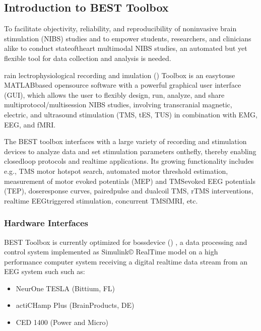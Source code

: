 \documentclass[letterpaper,10pt,english]{sphinxmanual}
\begin{document}
\subsection{Introduction to BEST Toolbox}
\label{\detokenize{1_Home:introduction-to-best-toolbox}}\label{\detokenize{1_Home::doc}}
\sphinxAtStartPar
To facilitate objectivity, reliability, and reproducibility of non\sphinxhyphen{}invasive brain stimulation (NIBS) studies and to empower students, researchers, and clinicians alike to conduct state\sphinxhyphen{}of\sphinxhyphen{}the\sphinxhyphen{}art multimodal NIBS studies, an automated but yet flexible tool for data collection and analysis is needed.

\sphinxAtStartPar
{}rain lectrophysiological recording and imulation () Toolbox is an easy\sphinxhyphen{}to\sphinxhyphen{}use MATLAB\sphinxhyphen{}based open\sphinxhyphen{}source software with a powerful graphical user interface (GUI), which allows the user to flexibly design, run, analyze, and share multi\sphinxhyphen{}protocol/multi\sphinxhyphen{}session NIBS studies, involving transcranial magnetic, electric, and ultrasound stimulation (TMS, tES, TUS) in combination with EMG, EEG, and fMRI.

\sphinxAtStartPar
The BEST toolbox interfaces with a large variety of recording and stimulation devices to analyze data and set stimulation parameters on\sphinxhyphen{}the\sphinxhyphen{}fly, thereby enabling closed\sphinxhyphen{}loop protocols and real\sphinxhyphen{}time applications. Its growing functionality includes e.g., TMS motor hotspot search, automated motor threshold estimation, measurement of motor evoked potentials (MEP) and TMS\sphinxhyphen{}evoked EEG potentials (TEP), dose\sphinxhyphen{}response curves, paired\sphinxhyphen{}pulse and dual\sphinxhyphen{}coil TMS, rTMS interventions, real\sphinxhyphen{}time EEG\sphinxhyphen{}triggered stimulation, concurrent TMS\sphinxhyphen{}fMRI, etc.


\subsubsection{Hardware Interfaces}
\label{\detokenize{1_Home:hardware-interfaces}}
\sphinxAtStartPar
BEST Toolbox is currently optimized for bossdevice  () , a data processing and control system implemented as Simulink© Real\sphinxhyphen{}Time model on a high performance computer system receiving a digital real\sphinxhyphen{}time data stream from an EEG system such such as:
\begin{itemize}
\item {} 
\sphinxAtStartPar
NeurOne TESLA (Bittium, FL)

\item {} 
\sphinxAtStartPar
actiCHamp Plus (BrainProducts, DE)

\item {} 
\sphinxAtStartPar
CED 1400 (Power and Micro)

\end{itemize}
\end{document}
